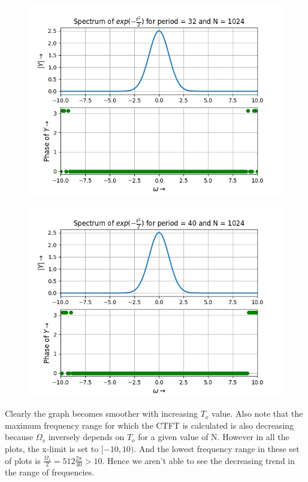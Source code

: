 \documentclass[12pt, a4paper]{article}
\begin{document}
\begin{figure}[H]
    \centering
    \includegraphics[scale = 0.8]{Figure_14.png}
    \label{fig:sample}
\end{figure}

\begin{figure}[H]
    \centering
    \includegraphics[scale = 0.8]{Figure_15.png}
    \label{fig:sample}
\end{figure}

Clearly the graph becomes smoother with increasing $T_{o}$ value. Also note that the maximum frequency range for which the CTFT is calculated is also decreasing because $\Omega_{s}$ inversely depends on $T_{o}$ for a given value of N. However in all the plots, the x-limit is set to $[-10,10)$. And the lowest frequency range in these set of plots is $\frac{\Omega_{s}}{2} = 512\frac{2\pi}{40} > 10$. Hence we aren't able to see the decreasing trend in the range of frequencies.
\end{document}
